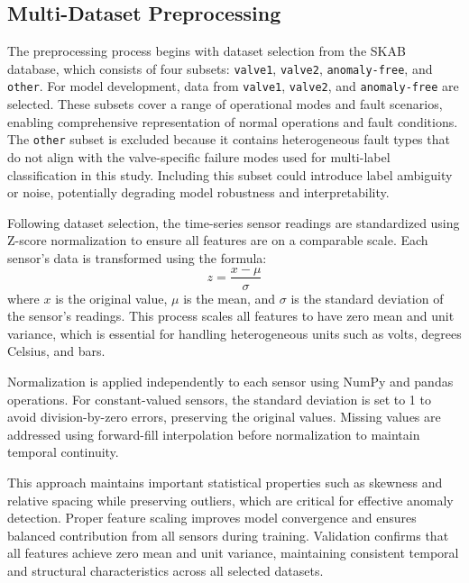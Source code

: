 \subsection*{Multi-Dataset Preprocessing}

The preprocessing process begins with dataset selection from the SKAB database, which consists of four subsets: \texttt{valve1}, \texttt{valve2}, \texttt{anomaly-free}, and \texttt{other}. For model development, data from \texttt{valve1}, \texttt{valve2}, and \texttt{anomaly-free} are selected. These subsets cover a range of operational modes and fault scenarios, enabling comprehensive representation of normal operations and fault conditions. The \texttt{other} subset is excluded because it contains heterogeneous fault types that do not align with the valve-specific failure modes used for multi-label classification in this study. Including this subset could introduce label ambiguity or noise, potentially degrading model robustness and interpretability.

Following dataset selection, the time-series sensor readings are standardized using Z-score normalization to ensure all features are on a comparable scale. Each sensor's data is transformed using the formula:
\begin{equation}
z = \frac{x - \mu}{\sigma}
\label{eq:zscore}
\end{equation}
where $x$ is the original value, $\mu$ is the mean, and $\sigma$ is the standard deviation of the sensor's readings. This process scales all features to have zero mean and unit variance, which is essential for handling heterogeneous units such as volts, degrees Celsius, and bars.

Normalization is applied independently to each sensor using NumPy and pandas operations. For constant-valued sensors, the standard deviation is set to 1 to avoid division-by-zero errors, preserving the original values. Missing values are addressed using forward-fill interpolation before normalization to maintain temporal continuity.

This approach maintains important statistical properties such as skewness and relative spacing while preserving outliers, which are critical for effective anomaly detection. Proper feature scaling improves model convergence and ensures balanced contribution from all sensors during training. Validation confirms that all features achieve zero mean and unit variance, maintaining consistent temporal and structural characteristics across all selected datasets. 